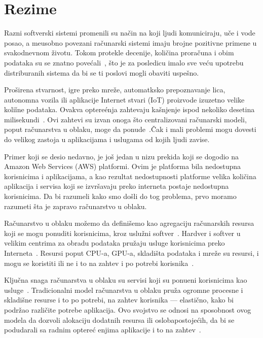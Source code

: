 \chapter*{Rezime}
\pagestyle{plain}

Razni softverski sistemi promenili su na\v cin na koji ljudi komuniciraju, u\v ce i vode posao, a me\dj usobno povezani ra\v cunarski sistemi imaju brojne pozitivne primene u svakodnevnom \v zivotu. Tokom protekle decenije, koli\v cina prora\v cuna i obim podataka su se znatno pove\'cali~\cite {ChiangZ16}, \v sto je za posledicu imalo sve ve\'cu upotrebu distriburanih sistema da bi se ti poslovi mogli obaviti uspe\v sno.

Pro\v sirena stvarnost, igre preko mre\v ze, automatksko prepoznavanje lica, autonomna vozila ili aplikacije Internet stvari (IoT) proizvode izuzetno velike koli\v ine podataka. Ovakva optere\'enja zahtevaju ka\v snjenje ispod nekoliko desetina milisekundi~\cite {ChiangZ16}. Ovi zahtevi su izvan onoga \v sto centralizovani ra\v cunarski modeli, poput ra\v cunarstva u oblaku, moge da ponude~\cite {ChiangZ16}.\v Cak i mali problemi mogu dovesti do velikog zastoja u aplikacijama i uslugama od kojih ljudi zavise. 

Primer koji se desio nedavno, je još jedan u nizu prekida koji se dogodio na Amazon Web Services (AWS) platformi. Ovim je platforma bila nedostupna korisnicima i aplikacijama, a kao rezultat nedostupnosti platforme velika koli\v cina aplikacija i servisa koji se izvr\v savaju preko interneta postaje nedostupna korisnicima. Da bi razumeli kako smo do\v sli do tog problema, prvo moramo razumeti \v sta je zapravo ra\v cunarstvo u oblaku.

Računarstvo u oblaku mo\v zemo da defini\v semo kao agregaciju ra\v cunarskih resursa koji se mogu ponuditi korisnicima, kroz uslu\v zni softver~\cite {Vogels}. Hardver i softver u velikim centrima za obradu podataka pru\v zaju usluge korisnicima preko Interneta~\cite {AboveTheCloud}. Resursi poput CPU-a, GPU-a, skladi\v sta podataka i mre\v ze su resursi, i mogu se koristiti ili ne i to na zahtev i po potrebi korisnika~\cite {ZhangCB10}. 

Klju\v cna snaga ra\v cunarstva u oblaku su servisi koji su ponu\dj eni korisnicima kao usluge~\cite {Vogels}. Tradicionalni model ra\v cunarstva u oblaku pru\v za ogromne procesne i skladi\v sne resurse i to po potrebi, na zahtev korisnika --- elasti\v cno, kako bi podr\v zao razli\v cite potrebe aplikacija.  Ovo svojstvo se odnosi na sposobnost ovog modela da dozvoli alokaciju dodatnih resursa ili osloba\dj postoje\'cih, da bi se podudarali sa radnim optere\'c enjima aplikacije i to na zahtev~\cite {AssuncaoVB18}.

